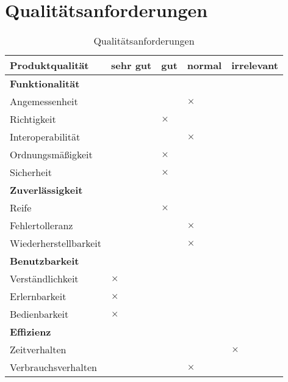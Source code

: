 \chapter{Qualitätsanforderungen}

\begin{table}[H]
	\centering
	\caption{Qualitätsanforderungen}
	\begin{tabularx}{\textwidth}{l|X|X|X|X}
		\toprule
		\textbf{Produktqualität}       & \centering \textbf{sehr gu}t & \centering \textbf{gut}      & \centering \textbf{normal}   & \textbf{irrelevant} \\
		\toprule
		\multicolumn{5}{l}{\textbf{Funktionalität}}                           \\ 
		\midrule
		\quad Angemessenheit        &          &          & $\times$ &  \\ \hline
		\quad Richtigkeit           &          &  $\times$ &          &  \\ \hline
		\quad Interoperabilität     &          &          & $\times$ &  \\ \hline
		\quad Ordnungsmäßigkeit     &          & $\times$ &          &  \\ \hline
		\quad Sicherheit            &          & $\times$ &          &  \\
		\toprule
		\multicolumn{5}{l}{\textbf{Zuverlässigkeit}}                          \\
		\midrule
		\quad Reife                 &          & $\times$ &          &  \\ \hline
		\quad Fehlertolleranz       &          &          & $\times$ &  \\ \hline
		\quad Wiederherstellbarkeit &          &          & $\times$ &  \\ 
		\toprule
		\multicolumn{5}{l}{\textbf{Benutzbarkeit}}                            \\ 
		\midrule
		\quad Verständlichkeit      & $\times$ &          &          &  \\ \hline
		\quad Erlernbarkeit         & $\times$ &          &          &  \\ \hline
		\quad Bedienbarkeit         & $\times$ &          &          &  \\ 
		\toprule
		\multicolumn{5}{l}{\textbf{Effizienz}}                                \\
		\midrule
		\quad Zeitverhalten         &          &          &          & $\times$       \\ \hline
		\quad Verbrauchsverhalten   &          &          & $\times$ &  \\ 

\end{tabularx}
\end{table}
